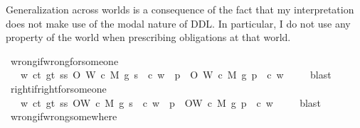 \begin{isabellebody}
\begin{isamarkuptext}
Generalization across worlds is a consequence of the fact that my interpretation does not make use of the 
modal nature of DDL. In particular, I do not use any property of the world when prescribing obligations 
at that world.%
\end{isamarkuptext}\isamarkuptrue%
\isamarkupfalse%
\ wrong{\isacharunderscore}if{\isacharunderscore}wrong{\isacharunderscore}for{\isacharunderscore}someone{\isacharcolon}\isanewline
\ \ \ {\isachardoublequoteopen}{\isasymforall}w{\isachardot}\ {\isasymforall}c{\isacharcolon}{\isacharcolon}t{\isachardot}\ {\isasymforall}g{\isacharcolon}{\isacharcolon}t{\isachardot}\ {\isasymexists}s{\isacharcolon}{\isacharcolon}s{\isachardot}\ O{\isacharbraceleft}\isactrlbold {\isasymnot}\ {\isacharparenleft}W\ {\isacharparenleft}c{\isacharcomma}\ M{\isacharcomma}\ g{\isacharparenright}\ s{\isacharparenright}\ {\isacharbar}\ c{\isacharbraceright}\ w\ {\isasymlongrightarrow}\ {\isacharparenleft}{\isasymforall}p{\isachardot}\ \ O{\isacharbraceleft}\isactrlbold {\isasymnot}\ {\isacharparenleft}W\ {\isacharparenleft}c{\isacharcomma}\ M{\isacharcomma}\ g{\isacharparenright}\ p{\isacharparenright}\ {\isacharbar}\ c{\isacharbraceright}\ w{\isacharparenright}\ {\isachardoublequoteclose}\isanewline
%
\isadelimproof
\ \ %
\endisadelimproof
%
\isatagproof
{}\isamarkupfalse%
\ blast%
\endisatagproof
{\isafoldproof}%
%
\isadelimproof
\isanewline
%
\endisadelimproof
\isanewline
{}\isamarkupfalse%
\ right{\isacharunderscore}if{\isacharunderscore}right{\isacharunderscore}for{\isacharunderscore}someone{\isacharcolon}\isanewline
\ \ \ {\isachardoublequoteopen}{\isasymforall}w{\isachardot}\ {\isasymforall}c{\isacharcolon}{\isacharcolon}t{\isachardot}\ {\isasymforall}g{\isacharcolon}{\isacharcolon}t{\isachardot}\ {\isasymexists}s{\isacharcolon}{\isacharcolon}s{\isachardot}\ O{\isacharbraceleft}W\ {\isacharparenleft}c{\isacharcomma}\ M{\isacharcomma}\ g{\isacharparenright}\ s\ {\isacharbar}\ c{\isacharbraceright}\ w\ {\isasymlongrightarrow}\ {\isacharparenleft}{\isasymforall}p{\isachardot}\ \ O{\isacharbraceleft}W\ {\isacharparenleft}c{\isacharcomma}\ M{\isacharcomma}\ g{\isacharparenright}\ p\ {\isacharbar}\ c{\isacharbraceright}\ w{\isacharparenright}\ {\isachardoublequoteclose}\isanewline
%
\isadelimproof
\ \ %
\endisadelimproof
%
\isatagproof
{}\isamarkupfalse%
\ blast%
\endisatagproof
{\isafoldproof}%
%
\isadelimproof
\isanewline
%
\endisadelimproof
\isanewline
{}\isamarkupfalse%
\ wrong{\isacharunderscore}if{\isacharunderscore}wrong{\isacharunderscore}somewhere{\isacharcolon}\isanewline

\end{isabellebody}
